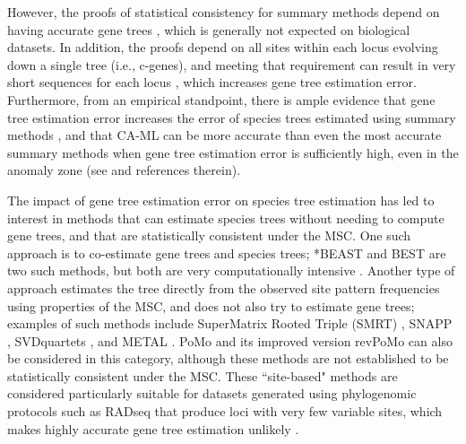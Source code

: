 However, the proofs of statistical consistency for summary methods
depend on having accurate gene trees \cite{roch2015robustness}, which
is generally not expected on biological datasets.  In addition, the
proofs depend on all  sites within each locus evolving down a single tree (i.e., c-genes), and
meeting that requirement can result in very short sequences for each
locus \cite{SpringerGatesy2016}, which increases gene tree estimation
error.  
Furthermore, from an empirical standpoint, there is ample evidence that
gene tree estimation error increases the error of
species trees estimated using summary methods
\cite{huang2010sources,patel2013error,DeGiorgioDegnan2014,GatesyMPE2014,bayzid2013naive,mirarab2014evaluating,SpringerGatesy2016,Meiklejohn2016,MolloyWarnow2017},
and that CA-ML can be more accurate than even the most accurate summary methods when gene tree estimation error is sufficiently high, even in the anomaly zone (see \cite{MolloyWarnow2017} and references therein).

The impact of gene tree estimation error on species tree estimation
has led to interest in methods that can estimate species trees without
needing to compute gene trees, and that are statistically consistent under the MSC.
One such approach is to co-estimate gene
trees and species trees; *BEAST \cite{StarBEAST} and BEST
\cite{Liu2008} are two such methods, but both are very
computationally intensive 
\cite{bayzid2013naive,bbca,knowles2009estimating,mccormack,leavitt2016resolving}.
Another type of approach estimates the tree directly from the observed site pattern frequencies using properties of the MSC,
and does not also try to estimate gene trees; examples of such methods include   
SuperMatrix Rooted Triple (SMRT) \cite{DeGiorgio2010}, SNAPP \cite{bryant2012inferring}, SVDquartets \cite{chifman2014quartet}, and METAL \cite{metal,MosselRoch2015}.
 PoMo \cite{pomo} and its improved version revPoMo \cite{revPomo} can also be considered in this category, although these methods are not established to be statistically consistent under the MSC.
These ``site-based" methods are considered
particularly suitable for  datasets generated using phylogenomic protocols such
as RADseq that produce  
  loci with very few variable sites, which makes highly accurate gene tree estimation 
unlikely
\cite{de2017phylogenomics}.

